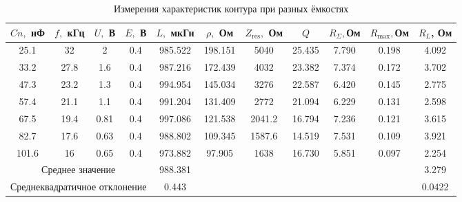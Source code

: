 \documentclass[a4paper]{article}
\begin{document}
\begin{enumerate}
          \begin{table}[h]
              \centering
              \begin{center}
                  \caption{Измерения характеристик контура при разных ёмкостях}
              \end{center}
              \vspace{0.1cm}
              \label{tab:my_label}
              \begin{tabular}{ |c|c|c|c|c|c|c|c|c|c|c|}
                  \hline
                  $Cn,$ нФ                                            & $f,$ кГц & $U,$ В                 & $E,$ В & $L,$ мкГн & $\rho,$ Ом & $Z_\text{res},$ Ом & $Q$    & $R_{\Sigma},$Ом & $R_\text{max}, $Ом & $R_L$, Ом \\ \hline
                  25.1                                                & 32       & 2                      & 0.4    & 985.522   & 198.151    & 5040               & 25.435 & 7.790           & 0.198              & 4.092     \\\hline
                  33.2                                                & 27.8     & 1.6                    & 0.4    & 987.216   & 172.439    & 4032               & 23.382 & 7.374           & 0.172              & 3.702     \\\hline
                  47.3                                                & 23.2     & 1.3                    & 0.4    & 994.954   & 145.034    & 3276               & 22.587 & 6.420           & 0.145              & 2.775     \\\hline
                  57.4                                                & 21.1     & 1.1                    & 0.4    & 991.204   & 131.409    & 2772               & 21.094 & 6.229           & 0.131              & 2.598     \\\hline
                  67.5                                                & 19.4     & 0.81                   & 0.4    & 997.086   & 121.538    & 2041.2             & 16.794 & 7.236           & 0.121              & 3.615     \\\hline
                  82.7                                                & 17.6     & 0.63                   & 0.4    & 988.802   & 109.345    & 1587.6             & 14.519 & 7.531           & 0.109              & 3.921     \\\hline
                  101.6                                               & 16       & 0.65                   & 0.4    & 973.882   & 97.905     & 1638               & 16.730 & 5.851           & 0.097              & 2.254     \\\hline
                  \multicolumn{4}{|c|}{Среднее значение}              & 988.381  & \multicolumn{5}{|c|}{} & 3.279                                                                                                            \\ \hline
                  \multicolumn{4}{|c|}{Среднеквадратичное отклонение} & 0.443    & \multicolumn{5}{|c|}{} & 0.0422                                                                                                           \\ \hline


\end{tabular}
\end{table}
\end{enumerate}
\end{document}
